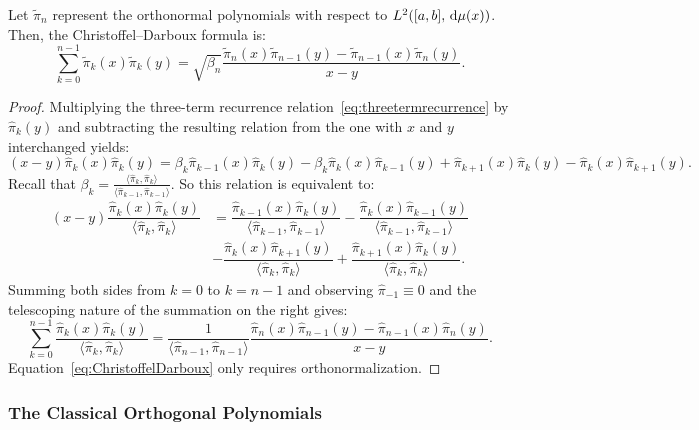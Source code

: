 \begin{theorem}\label{theorem:ChristoffelDarboux}
Let $\tilde{\pi}_n$ represent the orthonormal polynomials with respect to $L^2([a,b],{\rm\,d}\mu(x))$. Then, the Christoffel--Darboux formula is:
\begin{equation}\label{eq:ChristoffelDarboux}
\sum_{k=0}^{n-1}\tilde{\pi}_k(x)\tilde{\pi}_k(y) = \sqrt{\beta_n}\dfrac{\tilde{\pi}_n(x)\tilde{\pi}_{n-1}(y) - \tilde{\pi}_{n-1}(x)\tilde{\pi}_n(y)}{x-y}.
\end{equation}
\end{theorem}
\begin{proof}
Multiplying the three-term recurrence relation~\eqref{eq:threetermrecurrence} by $\hat{\pi}_k(y)$ and subtracting the resulting relation from the one with $x$ and $y$ interchanged yields:
\[
(x-y)\hat{\pi}_k(x)\hat{\pi}_k(y) = \beta_k\hat{\pi}_{k-1}(x)\hat{\pi}_k(y) - \beta_k \hat{\pi}_k(x)\hat{\pi}_{k-1}(y) + \hat{\pi}_{k+1}(x)\hat{\pi}_k(y) - \hat{\pi}_k(x)\hat{\pi}_{k+1}(y).
\]
Recall that $\beta_k = \frac{\langle \hat{\pi}_k,\hat{\pi}_k\rangle}{\langle\hat{\pi}_{k-1},\hat{\pi}_{k-1}\rangle}$. So this relation is equivalent to:
\begin{align*}
(x-y)\dfrac{\hat{\pi}_k(x)\hat{\pi}_k(y)}{\langle \hat{\pi}_k,\hat{\pi}_k\rangle} & = \dfrac{\hat{\pi}_{k-1}(x)\hat{\pi}_k(y)}{\langle\hat{\pi}_{k-1},\hat{\pi}_{k-1}\rangle} - \dfrac{\hat{\pi}_k(x)\hat{\pi}_{k-1}(y)}{\langle\hat{\pi}_{k-1},\hat{\pi}_{k-1}\rangle}\\ & - \dfrac{\hat{\pi}_k(x)\hat{\pi}_{k+1}(y)}{\langle \hat{\pi}_k,\hat{\pi}_k\rangle} + \dfrac{\hat{\pi}_{k+1}(x)\hat{\pi}_k(y)}{\langle \hat{\pi}_k,\hat{\pi}_k\rangle}.
\end{align*}
Summing both sides from $k=0$ to $k=n-1$ and observing $\hat{\pi}_{-1}\equiv0$ and the telescoping nature of the summation on the right gives:
\[
\sum_{k=0}^{n-1} \dfrac{\hat{\pi}_k(x)\hat{\pi}_k(y)}{\langle \hat{\pi}_k,\hat{\pi}_k\rangle} = \dfrac{1}{\langle \hat{\pi}_{n-1},\hat{\pi}_{n-1}\rangle} \dfrac{\hat{\pi}_n(x)\hat{\pi}_{n-1}(y) - \hat{\pi}_{n-1}(x)\hat{\pi}_n(y)}{x-y}.
\]
Equation~\eqref{eq:ChristoffelDarboux} only requires orthonormalization.
\end{proof}

\subsubsection{The Classical Orthogonal Polynomials}

